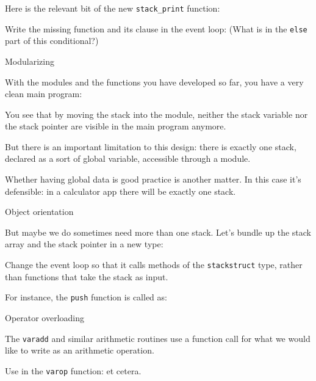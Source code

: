 Here is the relevant bit of the new \lstinline{stack_print} function:
%

\begin{exercise}
  Write the missing function and its clause in the event loop:
  \def\snippetcodefraction{.7}
  \def\snippetanswfraction{.9}
  (What is in the \lstinline{else} part of this conditional?)
\end{exercise}

 {Modularizing}

With the modules and the functions you have developed so far,
you have a very clean main program:
%

You see that by moving the stack into the module,
neither the stack variable nor the stack pointer
are visible in the main program anymore.


But there is an important limitation to this design:
there is exactly one stack,
declared as a sort of global variable, accessible through a module.


Whether having global data is good practice is another matter.
In this case it's defensible: in a calculator app there will be
exactly one stack.

 {Object orientation}

But maybe we do sometimes need more than one stack.
Let's bundle up the stack array and the stack pointer
in a new type:
%

\begin{exercise}
  \label{ex:f-stack-push}
  Change the event loop so that it calls methods
  of the \lstinline{stackstruct} type,
  rather than functions that take the stack as input.

  For instance, the \lstinline{push} function is called as:
\end{exercise}


 {Operator overloading}

The \lstinline{varadd} and similar arithmetic routines
use a function call for what we would like to write
as an arithmetic operation.

\begin{exercise}
  Use  in the \lstinline{varop} function:
  et cetera.  
\end{exercise}
